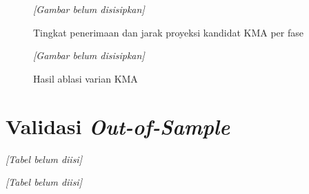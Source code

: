         \begin{figure}[H]
            \centering
            \textit{[Gambar belum disisipkan]}
            \caption{Tingkat penerimaan dan jarak proyeksi kandidat KMA per fase}\label{fig:kma acceptance}
        \end{figure}

        \begin{figure}[H]
            \centering
            \textit{[Gambar belum disisipkan]}
            \caption{Hasil ablasi varian KMA}\label{fig:kma ablation}
        \end{figure}

    \section{Validasi \textit{Out-of-Sample}}\label{sec:validation}

        \begin{table}[H]
            \centering
            \caption{Kelayakan solusi pada bank validasi terhadap batas bank latih}\label{tab:validation feasibility}
            \textit{[Tabel belum diisi]}
        \end{table}

        \begin{table}[H]
            \centering
            \caption{Kelayakan solusi terhadap batas risiko dari bank validasi}\label{tab:validation true limits}
            \textit{[Tabel belum diisi]}
        \end{table}

